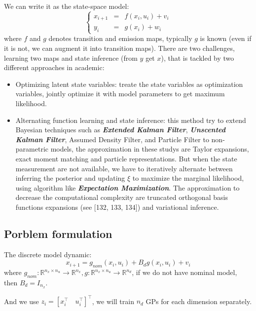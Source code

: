 \documentclass[10pt]{elegantbook}
\newcommand{\mydefination}[1]{\textbf{\textit{\textcolor{structurecolor}{#1}}}}
\begin{document}
We can write it as the state-space model:
\begin{equation}
    \left \{ 
    \begin{array}{rll}
        x_{i+1} &=& f(x_i, u_i) + v_i \\
        y_i &=& g(x_i) + w_i
    \end{array}    
    \right .    
\end{equation}
where $f$ and $g$ denotes transition and emission maps, typically $g$ is known (even if it is not, we can augment it into 
transition maps). There are two challenges, learning two maps and state inference (from $y$ get $x$), that is tackled by two
different approaches in academic:
\begin{itemize}
    \item Optimizing latent state variables: treate the state variables as optimization variables, jointly optimize it with 
model parameters to get maximum likelihood.
    \item Alternating function learning and state inference: this method try to extend Bayesian techniques such as 
\mydefination{Extended Kalman Filter}, \mydefination{Unscented Kalman Filter}, Assumed Density Filter, and Particle Filter 
to non-parametric models, the approximation in these 
studys are Taylor expansions, exact moment matching and particle representations. But when the state measurement
are not available, we have to iteratively alternate between inferring the posterior and updating $ \xi $ to maximize the 
marginal likelihood, using algorithm like \mydefination{Expectation Maximization}. The approximation to decrease the computational
complexity are truncated orthogonal basis functions expansions (see [132, 133, 134]) and variational inference.
\end{itemize}

\subsection{Porblem formulation}
The discrete model dynamic:
\begin{equation} \label{eq:gp_dynamic_model}
    x_{i+1} = g_{nom}(x_i, u_i) + B_d g(x_i, u_i) + v_i
\end{equation}
where $g_{nom}: \mathbb R^{n_x \times n_u} \rightarrow \mathbb R^{n_x}, g: \mathbb R^{n_x \times n_u} \rightarrow \mathbb R^{n_d}$, 
if we do not have nominal model, then $B_d = I_{n_x}$.

And we use $z_i = [x_i^{\top} \quad u_i^{\top}]^{\top}$, we will train $n_d$ GPs for each dimension separately.
\end{document}
